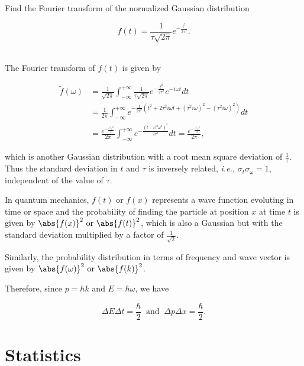 \documentclass[english,a4paper,12pt]{report}
\begin{document}
{Find the Fourier transform of the normalized Gaussian distribution 

\begin{equation}
    f(t) = \frac{1}{\tau \sqrt{2\pi } } e^{-\frac{t^2}{2\tau ^2} }.
\end{equation}~
}
{The Fourier transform of \(f(t)\) is given by 

\begin{equation}
    \begin{aligned} 
    \tilde{f}(\omega ) &= \frac{1}{\sqrt{2\pi } } \int_{-\infty}^{+\infty} \frac{1}{\tau \sqrt{2\pi } } e^{-\frac{t^2}{2\tau ^2} } e^{-i \omega t}dt \\
    &= \frac{1}{2\pi  } \int_{-\infty}^{+\infty}  e^{-\frac{1}{2\tau ^2} (t^2 + 2\tau ^2i \omega t + (\tau ^2i \omega )^2 - (\tau ^2 i \omega )^2) } dt \\
    &= \frac{e^{-\frac{\tau ^2\omega ^2}{2} } }{2\pi  }  \int_{-\infty}^{+\infty} e^{-\frac{(t-i\tau ^2\omega ^2)^2}{2\tau ^2} }dt = \frac{e^{-\frac{\tau ^2\omega ^2}{2} } }{2\pi  },
    \end{aligned}         
\end{equation}

which is another Gaussian distribution with a root mean square deviation of \(\frac{1}{\tau } \). Thus the standard deviation in \(t \text { and } \tau \) is inversely related, \textit{i.e.,} \(\sigma _{t}\sigma _{\omega }=1  \), independent of the value of \(\tau \). 

In quantum mechanics, \(f(t) \text { or }  f(x)\) represents a wave function evoluting in time or space and the probability of finding the particle at position \(x\) at time \(t\) is given by \(\abs{f(x)}^2 \text { or } \abs{f(t)}^2  \), which is also a Gaussian but with the standard deviation multiplied by a factor of \(\frac{1}{\sqrt{2} } \). 

Similarly, the probability distribution in terms of frequency and wave vector is given by \(\abs{f(\omega )}^2 \text { or } \abs{f(k)}^2 \). 

Therefore, since \(p = \hbar k \text { and } E = \hbar \omega \), we have 

\begin{equation}
    \Delta E \Delta t = \frac{\hbar }{2} ~\text { and }~ \Delta p\Delta x = \frac{\hbar }{2}.  
\end{equation}


} 


\chapter{Statistics}
		
\end{document}
